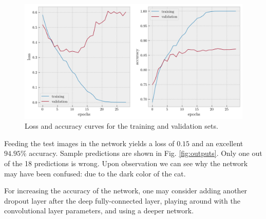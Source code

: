 \documentclass[12pt,a4paper]{article}
\begin{document}
\begin{figure}[htb]
	\centering
	\includegraphics[width=\textwidth]{loss-acc.png}
	\caption{Loss and accuracy curves for the training and validation sets.}
	\label{fig:loss-curves}
\end{figure}

\noindent Feeding the test images in the network yields a loss of $0.15$ and an excellent $94.95\%$ accuracy. Sample predictions are shown in Fig. \ref{fig:outputs}. Only one out of the 18 predictions is wrong. Upon observation we can see why the network may have been confused: due to the dark color of the cat.

For increasing the accuracy of the network, one may consider adding another dropout layer after the deep fully-connected layer, playing around with the convolutional layer parameters, and using a deeper network.
\end{document}
